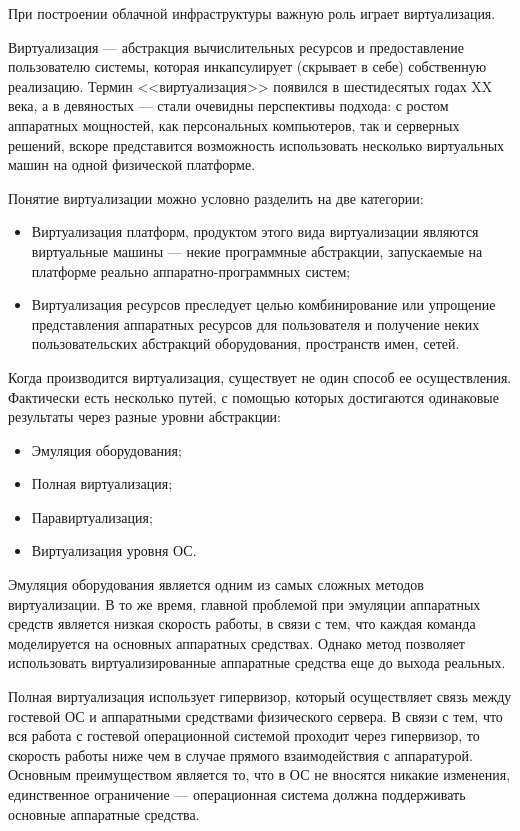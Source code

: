 При построении облачной инфраструктуры важную роль играет виртуализация.

Виртуализация --- абстракция вычислительных ресурсов и предоставление пользователю системы, которая инкапсулирует (скрывает в себе) собственную реализацию.
Термин <<виртуализация>> появился в шестидесятых годах XX века, а в девяностых --- стали очевидны перспективы подхода: с ростом аппаратных мощностей, как персональных компьютеров, так и серверных решений, вскоре представится возможность использовать несколько виртуальных машин на одной физической платформе.

Понятие виртуализации можно условно разделить на две категории:
\begin{itemize}
  \item Виртуализация платформ, продуктом этого вида виртуализации являются виртуальные машины --- некие программные абстракции, запускаемые на платформе реально аппаратно-программных систем;
  \item Виртуализация ресурсов преследует целью комбинирование или упрощение представления аппаратных ресурсов для пользователя и получение неких пользовательских абстракций оборудования, пространств имен, сетей.
\end{itemize}

Когда производится виртуализация, существует не один способ ее осуществления.
Фактически есть несколько путей, с помощью которых достигаются одинаковые результаты через разные уровни абстракции: \cite{openvz-tutorial}
\begin{itemize}
  \item Эмуляция оборудования;
  \item Полная виртуализация;
  \item Паравиртуализация;
  \item Виртуализация уровня ОС.
\end{itemize}

Эмуляция оборудования является одним из самых сложных методов виртуализации.
В то же время, главной проблемой при эмуляции аппаратных средств является низкая скорость работы, в связи с тем, что каждая команда моделируется на основных аппаратных средствах. 
Однако метод позволяет использовать виртуализированные аппаратные средства еще до выхода реальных.

Полная виртуализация использует гипервизор, который осуществляет связь между гостевой ОС и аппаратными средствами физического сервера.
В связи с тем, что вся работа с гостевой операционной системой проходит через гипервизор, то скорость работы ниже чем в случае прямого взаимодействия с аппаратурой.
Основным преимуществом является то, что в ОС не вносятся никакие изменения, единственное ограничение --- операционная система должна поддерживать основные аппаратные средства.

